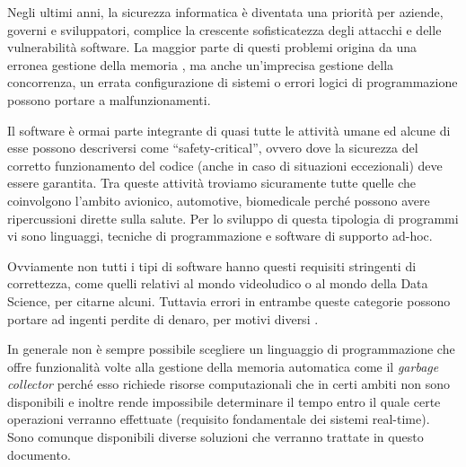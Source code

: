 Negli ultimi anni, la sicurezza informatica è diventata una priorità per aziende, governi e sviluppatori, complice la crescente sofisticatezza degli attacchi e delle vulnerabilità software. La maggior parte di questi problemi origina da una erronea gestione della memoria \cite{MemoryProblems}, ma anche un'imprecisa gestione della concorrenza, un errata configurazione di sistemi o errori logici di programmazione possono portare a malfunzionamenti.


Il software è ormai parte integrante di quasi tutte le attività umane ed alcune di esse possono descriversi come ``safety-critical'', ovvero dove la sicurezza del corretto funzionamento del codice (anche in caso di situazioni eccezionali) deve essere garantita. Tra queste attività troviamo sicuramente tutte quelle che coinvolgono l'ambito avionico, automotive, biomedicale perché possono avere ripercussioni dirette sulla salute. Per lo sviluppo di questa tipologia di programmi vi sono linguaggi, tecniche di programmazione e software di supporto ad-hoc.


Ovviamente non tutti i tipi di software hanno questi requisiti stringenti di correttezza, come quelli relativi al mondo videoludico o al mondo della Data Science, per citarne alcuni. Tuttavia errori in entrambe queste categorie possono portare ad ingenti perdite di denaro, per motivi diversi \cite{NintendoLooseMoney} \cite{LondonWhale}. 


In generale non è sempre possibile scegliere un linguaggio di programmazione che offre funzionalità volte alla gestione della memoria automatica come il \textit{garbage collector} perché esso richiede risorse computazionali che in certi ambiti non sono disponibili e inoltre rende impossibile determinare il tempo entro il quale certe operazioni verranno effettuate (requisito fondamentale dei sistemi real-time). Sono comunque disponibili diverse soluzioni che verranno trattate in questo documento.



